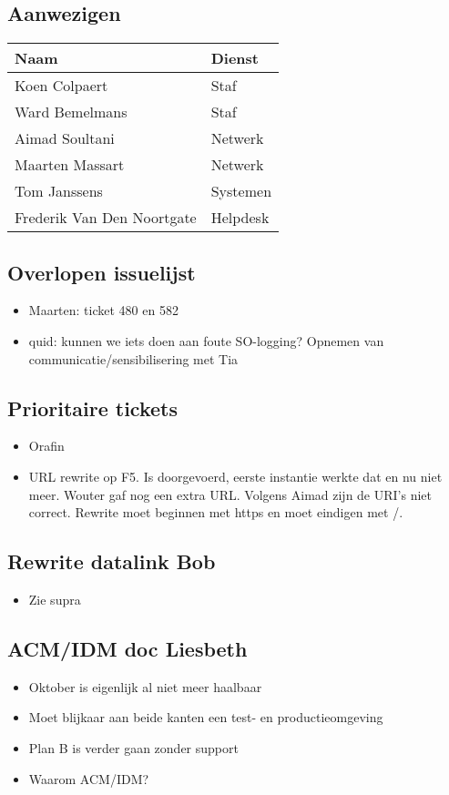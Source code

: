 \documentclass[11pt]{article}
\begin{document}
\subsection{Aanwezigen}
\label{sec:org6c3d276}
\begin{center}
\begin{tabular}{ll}
Naam & Dienst\\
\hline
Koen Colpaert & Staf\\
Ward Bemelmans & Staf\\
Aimad Soultani & Netwerk\\
Maarten Massart & Netwerk\\
Tom Janssens & Systemen\\
Frederik Van Den Noortgate & Helpdesk\\
\end{tabular}
\end{center}

\subsection{Overlopen issuelijst}
\label{sec:orgc19a7b3}
\begin{itemize}
\item Maarten: ticket 480 en 582
\item quid: kunnen we iets doen aan foute SO-logging? Opnemen van communicatie/sensibilisering met Tia
\end{itemize}
\subsection{Prioritaire tickets}
\label{sec:org36685fe}
\begin{itemize}
\item Orafin
\item URL rewrite op F5. Is doorgevoerd, eerste instantie werkte dat en nu niet meer. Wouter gaf nog een extra URL. Volgens Aimad zijn de URI's niet correct. Rewrite moet beginnen met https en moet eindigen met /.
\end{itemize}
\subsection{Rewrite datalink Bob}
\label{sec:org7986ea6}
\begin{itemize}
\item Zie supra
\end{itemize}
\subsection{ACM/IDM doc Liesbeth}
\label{sec:orgdb30219}
\begin{itemize}
\item Oktober is eigenlijk al niet meer haalbaar
\item Moet blijkaar aan beide kanten een test- en productieomgeving
\item Plan B is verder gaan zonder support
\item Waarom ACM/IDM?
\end{itemize}
\end{document}
